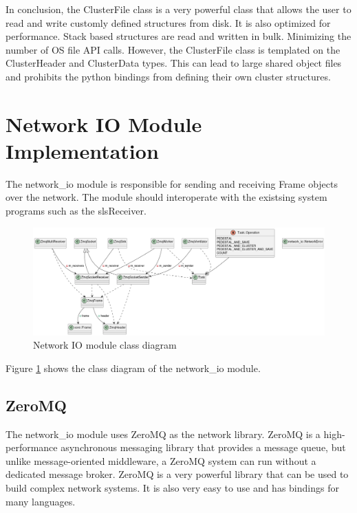 \documentclass[./chapitre3.tex]{subfiles}
\begin{document}
In conclusion, the ClusterFile class is a very powerful class that allows the user to read
and write customly defined structures from disk. It is also optimized for performance. Stack
based structures are read and written in bulk. Minimizing the number of OS file API calls.
However, the ClusterFile class is templated on the ClusterHeader and ClusterData types. This
can lead to large shared object files and prohibits the python bindings from defining their
own cluster structures.\\


\section{Network IO Module Implementation}
The network\_io module is responsible for sending and receiving Frame objects over the network.
The module should interoperate with the existsing system programs such as the slsReceiver.\\

\begin{figure}
    \centering
    \includegraphics[width=\textwidth]{Chapitre3/figures/network_io_class.png}
    \caption{Network IO module class diagram}
    \label{fig:network_io_class}
\end{figure}

Figure \ref{fig:network_io_class} shows the class diagram of the network\_io module.\\

\subsection{ZeroMQ}
The network\_io module uses ZeroMQ as the network library. ZeroMQ is a high-performance
asynchronous messaging library that provides a message queue, but unlike message-oriented
middleware, a ZeroMQ system can run without a dedicated message broker. ZeroMQ is a very
powerful library that can be used to build complex network systems. It is also very easy
to use and has bindings for many languages. \cite{hintjens2013zeromq} \\
\end{document}
